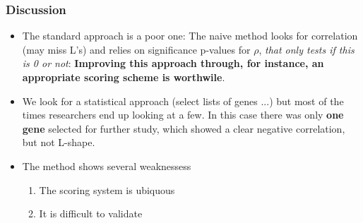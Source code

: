 \documentclass[handout]{beamer}
\begin{document}
\begin{frame}[allowframebreaks]
\frametitle{Discussion}

\begin{itemize}
	\item The standard approach is a poor one: The naive method looks for correlation (may miss L's) and relies on significance p-values for $\rho$, \textit{that only tests if this is 0 or not}: \textbf{Improving this approach through, for instance, an appropriate scoring scheme is worthwile}.
	\item We look for a statistical approach (select lists of genes ...) but most of the times researchers end up looking at a few. In this case there was only \textbf{one gene} selected for further study, which showed a clear negative correlation, but not L-shape.
	\item The method shows several weaknessess
	\begin{enumerate}
		\item The scoring system is ubiquous
		\item It is difficult to validate
		
	\end{enumerate}
\end{itemize}

\end{frame}
\end{document}
